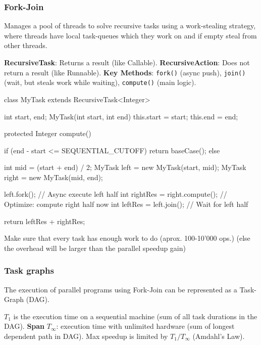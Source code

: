 \subsubsection{Fork-Join}

Manages a pool of threads to solve recursive tasks using a work-stealing strategy, where threads have local task-queues
which they work on and if empty steal from other threads.

\begin{definition}
\textbf{RecursiveTask}: Returns a result (like Callable).
\textbf{RecursiveAction}: Does not return a result (like Runnable).
\textbf{Key Methods}: \texttt{fork()} (async push), \texttt{join()} (wait, but steals work while waiting), \texttt{compute()} (main logic).
\end{definition}

\begin{codeexample}
class MyTask extends RecursiveTask<Integer> {
    int start, end;
    MyTask(int start, int end) { this.start = start; this.end = end; }
    
    protected Integer compute() {
        if (end - start <= SEQUENTIAL_CUTOFF) { 
            return baseCase(); 
        } else {
            int mid = (start + end) / 2;
            MyTask left = new MyTask(start, mid);
            MyTask right = new MyTask(mid, end);
            
            left.fork(); // Async execute left half
            int rightRes = right.compute(); // Optimize: compute right half now
            int leftRes = left.join();      // Wait for left half
            
            return leftRes + rightRes;
        } 
    }
}
\end{codeexample}

\begin{important}
Make sure that every task has enough work to do (aprox. 100-10'000 ops.) (else the overhead will be larger than the parallel speedup gain)
\end{important}

\subsubsection{Task graphs}

The execution of parallel programs using Fork-Join can be represented as a Task-Graph (DAG).

\begin{definition}
$T_1$ is the execution time on a sequential machine (sum of all task durations in the DAG).
\textbf{Span} $T_{\infty}$: execution time with unlimited hardware (sum of longest dependent path in DAG).
Max speedup is limited by $T_1 / T_{\infty}$ (Amdahl's Law).
\end{definition}

